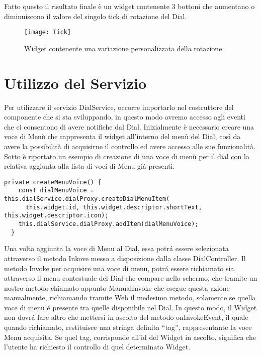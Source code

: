 \vspace{1.0cm}
Fatto questo il risultato finale è un widget contenente 3 bottoni che aumentano o diminuiscono il valore del singolo tick di rotazione del Dial.
\begin{figure}[htpb!]
\center
  \texttt{[image: Tick]}
  \caption{Widget contenente una variazione personalizzata della rotazione}
\end{figure}

\section{Utilizzo del Servizio}

Per utilizzare il servizio DialService, occorre importarlo nel costruttore del componente che si sta sviluppando, in questo modo avremo accesso agli eventi che ci consentono di avere notifiche dal Dial.
Inizialmente è necessario creare una voce di Menù che rappresenta il widget all’interno del menù del Dial, così da avere la possibilità di acquisirne il controllo ed avere accesso alle sue funzionalità.
Sotto è riportato un esempio di creazione di una voce di menù per il dial con la relativa aggiunta alla lista di voci di Menu giá presenti.

\vspace{1.0cm}
\begin{lstlisting}[caption={Creazione nuova voce da widget},style=javaScriptCode]
  private createMenuVoice() {
    const dialMenuVoice = this.dialService.dialProxy.createDialMenuItem(
      this.widget.id, this.widget.descriptor.shortText, this.widget.descriptor.icon);
    this.dialService.dialProxy.addItem(dialMenuVoice);
  }
\end{lstlisting} 
\vspace{1.0cm}

Una volta aggiunta la voce di Menu al Dial, essa potrá essere selezionata attraverso il metodo Inkove messo a disposizione dalla classe DialController. Il metodo Invoke per acquisire una voce di menu, potrá essere richiamato sia attraverso il menu contestuale del Dial che compare nello schermo, che tramite un nostro metodo chiamato appunto ManualInvoke che esegue questa azione manualmente, richiamando tramite Web il medesimo metodo, solamente se quella voce di menu é presente tra quelle disponibile nel Dial.
In questo modo, il Widget non dovrá fare altro che mettersi in ascolto del metodo onInvokeEvent, il quale quando richiamato, restituisce una stringa definita “tag”, rappresentante la voce Menu acquisita.
Se quel tag, corrisponde all’id del Widget in ascolto, significa che l’utente ha richiesto il controllo di quel determinato Widget.

